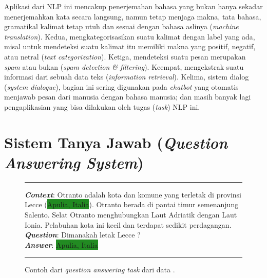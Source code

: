Aplikasi dari NLP ini mencakup penerjemahan bahasa yang bukan hanya sekadar menerjemahkan kata secara langsung, namun tetap menjaga makna, tata bahasa, gramatikal kalimat tetap utuh dan sesuai dengan bahasa aslinya (\emph{machine translation}). Kedua, mengkategorisasikan suatu kalimat dengan label yang ada, misal untuk mendeteksi suatu kalimat itu memiliki makna yang positif, negatif, atau netral (\emph{text categorization}). Ketiga, mendeteksi suatu pesan merupakan \emph{spam} atau bukan (\emph{spam detection \& filtering}). Keempat, mengekstrak suatu informasi dari sebuah data teks (\emph{information retrieval}). Kelima, sistem dialog (\emph{system dialogue}), bagian ini sering digunakan pada \emph{chatbot} yang otomatis menjawab pesan dari manusia dengan bahasa manusia; dan masih banyak lagi pengaplikasian yang bisa dilakukan oleh tugas (\emph{task}) NLP ini.

\section{Sistem Tanya Jawab (\emph{Question Answering System})}

\begin{figure}[h]
\vspace{3pt}
\hrule
\vspace{3pt}

\textbf{\emph{Context}}: Otranto adalah kota dan komune yang terletak di  \colorbox{BurntOrange}{provinsi Lecce} (\colorbox{ForestGreen}{Apulia, Italia}). Otranto berada di pantai timur semenanjung Salento. Selat Otranto menghubungkan Laut Adriatik dengan Laut Ionia. Pelabuhan kota ini kecil dan terdapat sedikit perdagangan.\\

\textbf{\emph{Question}}: \colorbox{BurntOrange}{Dimanakah letak Lecce ?}\\

\textbf{\emph{Answer}}:  \colorbox{ForestGreen}{Apulia, Italia}

\vspace{3pt}
\hrule
\vspace{3pt}
\centering
\caption{Contoh dari \emph{question answering task} dari data \citep{putri-oh-2022-idk}.}
\end{figure}

